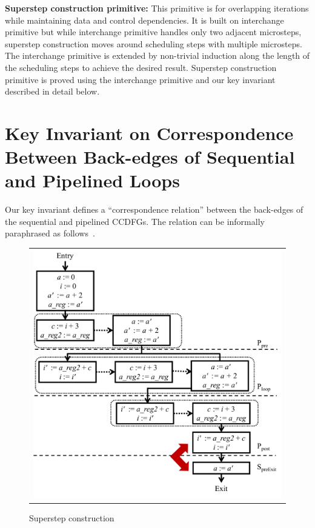 {\bf Superstep construction primitive:} This primitive is for overlapping iterations while 
maintaining data and control dependencies. It is built on interchange primitive but while interchange primitive
handles only two adjacent microsteps, superstep construction moves around scheduling steps with multiple microsteps. 
The interchange primitive is extended by non-trivial induction along the length of the scheduling steps to achieve the desired result. 
Superstep construction primitive is proved using the 
interchange primitive and our key invariant described in detail below. 

\section{Key Invariant on Correspondence Between Back-edges of Sequential and Pipelined Loops}
 Our key invariant defines a ``correspondence relation''
between the back-edges of the sequential and pipelined CCDFGs.
The relation can be informally paraphrased as
follows~\cite{disha-itp14}.

\begin{figure}[t!]
\begin{center}
\begin{tabular}{c}
\includegraphics[width=5.5in]{fig-proposal/algorithm-after-superstep-construction}
\end{tabular}
\end{center}
\caption{Superstep construction}
\label{fig:algo3-3}
\end{figure}

